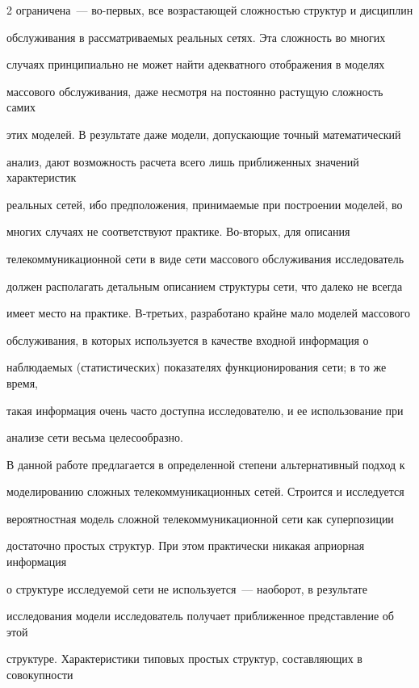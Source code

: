 \begin{multicols}{2}
ограничена~--- во-первых, все возрастающей сложностью структур и дисциплин


обслуживания в рас\-смат\-ри\-ва\-емых реальных сетях. Эта сложность во многих


случаях принципиально не может найти адекватного отображения в моделях


массового обслуживания, даже несмотря на постоянно растущую сложность самих


этих моделей. В результате даже модели, допускающие точный математический


анализ, дают возможность расчета всего лишь приближенных значений характеристик


реальных сетей, ибо предположения, принимаемые при построении моделей, во


многих случаях не соответствуют практике. Во-вторых, для описания


телекоммуникационной сети в виде сети массового обслуживания исследователь


должен располагать детальным описанием структуры сети, что далеко не всегда


имеет мес\-то на практике. В-третьих, разработано крайне мало моделей массового


обслуживания, в которых используется в качестве входной информация о


наблюдаемых (статистических) показателях функционирования сети; в то же время,


такая информация очень часто доступна исследователю, и ее использование при


анализе сети весьма целесообразно.





В данной работе предлагается в определенной степени альтернативный подход к


моделированию сложных телекоммуникационных сетей. Строится и исследуется


вероятностная модель сложной телекоммуникационной сети как суперпозиции


достаточно простых структур. При этом практически никакая априорная информация


о структуре исследуемой сети не используется~--- наоборот, в результате


исследования модели исследователь получает приближенное представление об этой


структуре. Характеристики типовых простых структур, составляющих в совокупности



\end{multicols}
